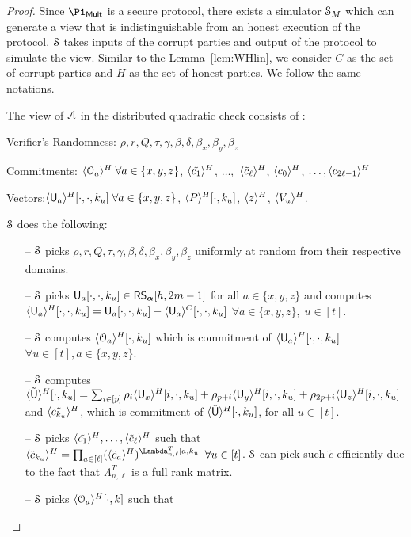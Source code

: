 \begin{proof}
	Since $\Pi_{\sf Mult}$ is a secure protocol, there exists a simulator $\mathcal{S}_{M}$ which can generate a view that is indistinguishable from an honest execution of the protocol. $\mathcal{S}$ takes inputs of the corrupt parties and output of the protocol to simulate the view. Similar to the Lemma~\ref{lem:WHlin}, we consider $C$ as the set of corrupt parties and $H$ as the set of honest parties. We follow the same notations.
	
	The view of $\mathcal{A}$ in the distributed quadratic check consists of :
	
	\noindent Verifier's Randomness: $\rho, r, Q, \tau, \gamma, \beta, \delta, \beta_x, \beta_y, \beta_z$
	
	\noindent Commitments: $\langle{\mathcal{O}_a}\rangle^H\; \forall a\in \{x,y,z\}$, $\langle{\tilde{c_1}}\rangle^H$, $\ldots,$ $\langle{\tilde{c}_{\ell}}\rangle^H$, $\langle{c_0}\rangle^H$, $\ldots, \langle{c_{2\ell-1}}\rangle^H$
	
	\noindent Vectors:$\langle{\mathsf{U}_a}\rangle^H[\cdot,\cdot,k_u] \; \forall a\in\{x,y,z\}$, $ \langle{P}\rangle^H[\cdot,k_u]$, $\langle{z}\rangle^H$, $\langle{V_u}\rangle^H$.
	
	$\mathcal{S}$ does the following:
	\begin{itemize}
		\item[--] $\mathcal{S}$ picks $\rho, r, Q, \tau, \gamma, \beta, \delta, \beta_x, \beta_y, \beta_z$ uniformly at random from their respective domains.
		\item[--] $\mathcal{S}$ picks $\mathsf{U}_a[\cdot,\cdot, k_u]\in \mathsf{RS}_{\bm{\alpha}}[h,2m-1]$ for all $a\in\{x,y,z\}$  and computes $\langle{\mathsf{U}_a}\rangle^H[\cdot,\cdot,k_u]= \mathsf{U}_a[\cdot, \cdot, k_u] - \langle{\mathsf{U}_a}\rangle^C[\cdot, \cdot, k_u]$ $\forall a\in\{x,y,z\},\; u\in[t]$.
		\item[--] $\mathcal{S}$ computes $\langle{\mathcal{O}_a}\rangle^H[\cdot,k_u]$ which is commitment of $\langle{\mathsf{U}_a}\rangle^H[\cdot, \cdot,k_u]$ $\forall u\in[t], a\in\{x,y,z\}$.
		\item[--] $\mathcal{S}$ computes $\langle{\tilde{\mathsf{U}}}\rangle^H[\cdot,k_u]=\sum_{i\in[p]} \rho_i \langle{\mathsf{U}_x}\rangle^H[i,\cdot,k_u]+ \rho_{p+i} \langle{\mathsf{U}_y}\rangle^H[i,\cdot,k_u]+ \rho_{2p+i} \langle{\mathsf{U}_z}\rangle^H[i,\cdot,k_u]$ and $\langle{\tilde{c_{k_u}}}\rangle^H$, which is commitment of $\langle{\tilde{\mathsf{U}}}\rangle^H[\cdot,k_u]$, for all $u\in [t]$.
		\item[--] $\mathcal{S}$ picks $\langle{\tilde{c_1}}\rangle^H, \ldots, \langle{\tilde{c}_{\ell}}\rangle^H$ such that 
		$\honshr{\tilde{c}_{k_u}} = \prod_{a\in[\ell]} (\honshr{\tilde{c}_{a}})^{\Lambda_{n,\ell}^T[a,k_u]} \; \forall u\in[t]$.
		$\mathcal{S}$ can pick such $\tilde{c}$ efficiently due to the fact that $\Lambda_{n,\ell}^T$ is a full rank matrix.
		\item[--] $\mathcal{S}$ picks $\langle{\mathcal{O}_a}\rangle^H[\cdot, k]$ such that
		

\end{itemize}
\end{proof}
